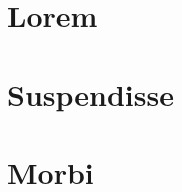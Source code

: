 \documentclass{article}
\begin{document}
\section{Lorem}
	\lipsum[1-5]
\section{Suspendisse}
	\lipsum[6-8]
\section{Morbi}
	\lipsum[9-10]
\end{document}
